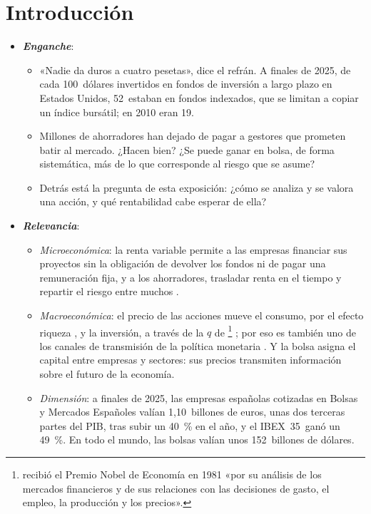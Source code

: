 \documentclass[11pt]{article}
\begin{document}
\tceetitulo

\section*{Introducción}

\begin{itemize}
\item \textbf{\emph{Enganche}}:
  \begin{itemize}
  \item «Nadie da duros a cuatro pesetas», dice el refrán. A finales de 2025, de cada 100~dólares invertidos en fondos de inversión a largo plazo en Estados Unidos, 52~estaban en fondos indexados, que se limitan a copiar un índice bursátil; en 2010 eran 19\nocite{ICI2026FactBook}.
  \item Millones de ahorradores han dejado de pagar a gestores que prometen batir al mercado. ¿Hacen bien? ¿Se puede ganar en bolsa, de forma sistemática, más de lo que corresponde al riesgo que se asume?
  \item Detrás está la pregunta de esta exposición: ¿cómo se analiza y se valora una acción, y qué rentabilidad cabe esperar de ella?
  \end{itemize}

\item \textbf{\emph{Relevancia}}:
  \begin{itemize}
  \item \emph{Microeconómica}: la renta variable permite a las empresas financiar sus proyectos sin la obligación de devolver los fondos ni de pagar una remuneración fija, y a los ahorradores, trasladar renta en el tiempo y repartir el riesgo entre muchos .
  \item \emph{Macroeconómica}: el precio de las acciones mueve el consumo, por el efecto riqueza , y la inversión, a través de la $q$ de \footnote{ recibió el Premio Nobel de Economía en 1981 «por su análisis de los mercados financieros y de sus relaciones con las decisiones de gasto, el empleo, la producción y los precios»\nocite{Nobel1981Tobin}.} ; por eso es también uno de los canales de transmisión de la política monetaria . Y la bolsa asigna el capital entre empresas y sectores: sus precios transmiten información sobre el futuro de la economía.
  \item \emph{Dimensión}: a finales de 2025, las empresas españolas cotizadas en Bolsas y Mercados Españoles valían 1,10~billones de euros, unas dos terceras partes del PIB, tras subir un 40~\% en el año, y el IBEX~35~ganó un 49~\%\nocite{BME2026InformeMercado,INE2026CNA}. En todo el mundo, las bolsas valían unos 152~billones de dólares\nocite{WFE2026Markets2025}.
  \end{itemize}


\end{itemize}
\end{document}
